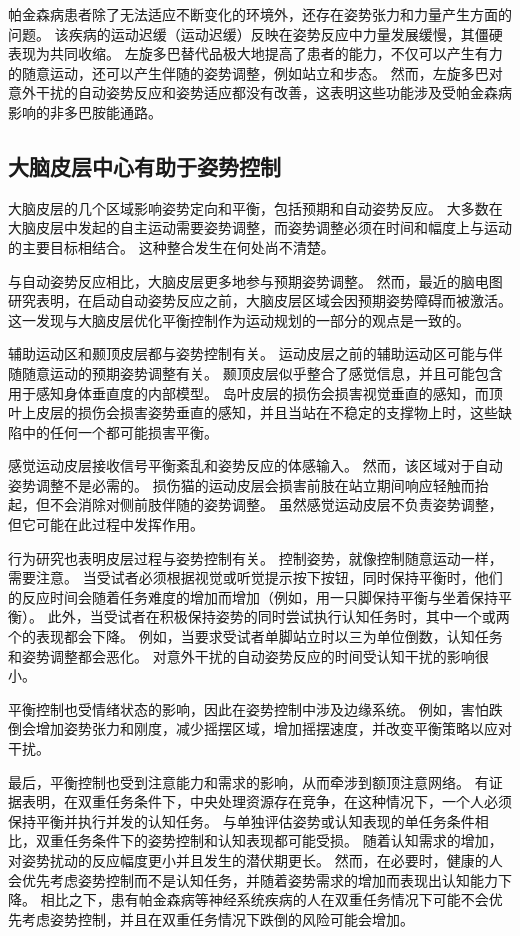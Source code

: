 帕金森病患者除了无法适应不断变化的环境外，还存在姿势张力和力量产生方面的问题。
该疾病的运动迟缓（运动迟缓）反映在姿势反应中力量发展缓慢，其僵硬表现为共同收缩。
左旋多巴替代品极大地提高了患者的能力，不仅可以产生有力的随意运动，还可以产生伴随的姿势调整，例如站立和步态。
然而，左旋多巴对意外干扰的自动姿势反应和姿势适应都没有改善，这表明这些功能涉及受帕金森病影响的非多巴胺能通路。



\subsection{大脑皮层中心有助于姿势控制}

大脑皮层的几个区域影响姿势定向和平衡，包括预期和自动姿势反应。
大多数在大脑皮层中发起的自主运动需要姿势调整，而姿势调整必须在时间和幅度上与运动的主要目标相结合。
这种整合发生在何处尚不清楚。


与自动姿势反应相比，大脑皮层更多地参与预期姿势调整。
然而，最近的脑电图研究表明，在启动自动姿势反应之前，大脑皮层区域会因预期姿势障碍而被激活。
这一发现与大脑皮层优化平衡控制作为运动规划的一部分的观点是一致的。


辅助运动区和颞顶皮层都与姿势控制有关。
运动皮层之前的辅助运动区可能与伴随随意运动的预期姿势调整有关。
颞顶皮层似乎整合了感觉信息，并且可能包含用于感知身体垂直度的内部模型。
岛叶皮层的损伤会损害视觉垂直的感知，而顶叶上皮层的损伤会损害姿势垂直的感知，并且当站在不稳定的支撑物上时，这些缺陷中的任何一个都可能损害平衡。


感觉运动皮层接收信号平衡紊乱和姿势反应的体感输入。
然而，该区域对于自动姿势调整不是必需的。
损伤猫的运动皮层会损害前肢在站立期间响应轻触而抬起，但不会消除对侧前肢伴随的姿势调整。
虽然感觉运动皮层不负责姿势调整，但它可能在此过程中发挥作用。


行为研究也表明皮层过程与姿势控制有关。
控制姿势，就像控制随意运动一样，需要注意。
当受试者必须根据视觉或听觉提示按下按钮，同时保持平衡时，他们的反应时间会随着任务难度的增加而增加（例如，用一只脚保持平衡与坐着保持平衡）。
此外，当受试者在积极保持姿势的同时尝试执行认知任务时，其中一个或两个的表现都会下降。
例如，当要求受试者单脚站立时以三为单位倒数，认知任务和姿势调整都会恶化。
对意外干扰的自动姿势反应的时间受认知干扰的影响很小。


平衡控制也受情绪状态的影响，因此在姿势控制中涉及边缘系统。
例如，害怕跌倒会增加姿势张力和刚度，减少摇摆区域，增加摇摆速度，并改变平衡策略以应对干扰。


最后，平衡控制也受到注意能力和需求的影响，从而牵涉到额顶注意网络。
有证据表明，在双重任务条件下，中央处理资源存在竞争，在这种情况下，一个人必须保持平衡并执行并发的认知任务。
与单独评估姿势或认知表现的单任务条件相比，双重任务条件下的姿势控制和认知表现都可能受损。
随着认知需求的增加，对姿势扰动的反应幅度更小并且发生的潜伏期更长。
然而，在必要时，健康的人会优先考虑姿势控制而不是认知任务，并随着姿势需求的增加而表现出认知能力下降。
相比之下，患有帕金森病等神经系统疾病的人在双重任务情况下可能不会优先考虑姿势控制，并且在双重任务情况下跌倒的风险可能会增加。


